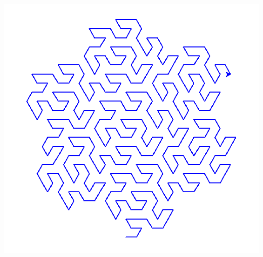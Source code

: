 \documentclass[11pt,class=report,crop=false]{standalone}
\begin{document}
\begin{activite}
\begin{enumerate}
\begin{center}
\includegraphics[scale=\myscale,scale=0.24]{screen-lsystems-10}
\end{center}


\end{enumerate}



\end{activite}
\end{document}
